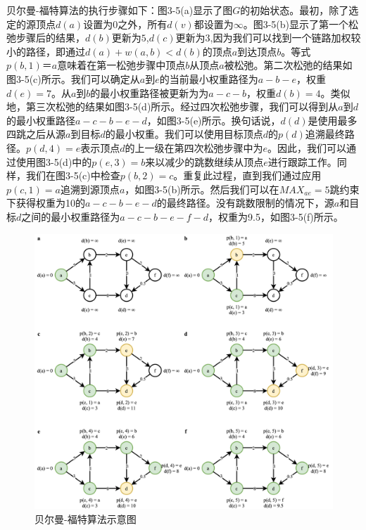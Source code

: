 贝尔曼-福特算法的执行步骤如下：图3-5(a)显示了图$G$的初始状态。最初，除了选定的源顶点$d(a)$设置为$0$之外，所有$d(v)$都设置为$\infty$。图3-5(b)显示了第一个松弛步骤后的结果，$d(b)$更新为$5$,$d(c)$更新为$3$,因为我们可以找到一个链路加权较小的路径，即通过$d(a)+w(a,b)<d(b)$的顶点$a$到达顶点$b$。等式$p(b,1)＝a$意味着在第一松弛步骤中顶点$b$从顶点$a$被松弛。第二次松弛的结果如图3-5(c)所示。我们可以确定从$a$到$e$的当前最小权重路径为${a-b-e}$，权重$d(e)=7$。从$a$到$b$的最小权重路径被更新为为${a-c-b}$，权重$d(b)=4$。类似地，第三次松弛的结果如图3-5(d)所示。经过四次松弛步骤，我们可以得到从$a$到$d$的最小权重路径${a-c-b-e-d}$，如图3-5(e)所示。换句话说，$d(d)$是使用最多四跳之后从源$a$到目标$d$的最小权重。我们可以使用目标顶点$d$的$p(d)$追溯最终路径。$p(d,4)=e$表示顶点$d$的上一级在第四次松弛步骤中为$e$。因此，我们可以通过使用图3-5(d)中的$p(e,3)=b$来以减少的跳数继续从顶点$e$进行跟踪工作。同样，我们在图3-5(c)中检查$p(b,2)=c$。重复此过程，直到我们通过应用$p(c,1)=a$追溯到源顶点$a$，如图3-5(b)所示。然后我们可以在${MAX}_{ae}=5$跳约束下获得权重为10的${a-c-b-e-d}$的最终路径。没有跳数限制的情况下，源$a$和目标$d$之间的最小权重路径为${a-c-b-e-f-d}$，权重为9.5，如图3-5(f)所示。

\begin{figure}[htbp]
\setlength{\abovecaptionskip}{15pt plus 3pt minus 2pt}
\centerline{\includegraphics[width=1\textwidth]{./figures/ch3-bf.png}}
\caption{贝尔曼-福特算法示意图}
\label{fig-ch3-bf}
\end{figure}

